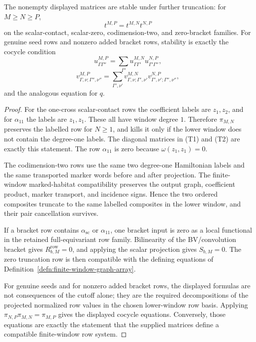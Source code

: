 \begin{prop}
  The nonempty displayed matrices are stable under further truncation:
  for \(M\geq N\geq P\),
  \[
    t^{M,P}=t^{M,N}t^{N,P}
  \]
  on the scalar-contact, scalar-zero, codimension-two, and zero-bracket
  families.  For genuine seed rows and nonzero added bracket rows, stability
  is exactly the cocycle condition
  \[
    u^{M,P}_{\Gamma\Gamma''}
      =
    \sum_{\Gamma'}u^{M,N}_{\Gamma\Gamma'}u^{N,P}_{\Gamma'\Gamma''},
  \]
  \[
    v^{M,P}_{\Gamma,\nu;\Gamma'',\nu''}
      =
    \sum_{\Gamma',\nu'}
      v^{M,N}_{\Gamma,\nu;\Gamma',\nu'}
      v^{N,P}_{\Gamma',\nu';\Gamma'',\nu''},
  \]
  and the analogous equation for \(q\).
\end{prop}

\begin{proof}
  For the one-cross scalar-contact rows the coefficient labels are
  \(z_1,z_2\), and for \(\alpha_{11}\) the labels are \(z_1,z_1\).  These
  all have window degree \(1\).  Therefore \(\pi_{M,N}\) preserves the
  labelled row for \(N\geq1\), and kills it only if the lower window does
  not contain the degree-one labels.  The diagonal matrices in (T1) and
  (T2) are exactly this statement.  The row \(\alpha_{11}\) is zero because
  \(\omega(z_1,z_1)=0\).

  The codimension-two rows use the same two degree-one Hamiltonian labels
  and the same transported marker words before and after projection.  The
  finite-window marked-habitat compatibility preserves the output graph,
  coefficient product, marker transport, and incidence signs.  Hence the two
  ordered composites truncate to the same labelled composites in the lower
  window, and their pair cancellation survives.

  If a bracket row contains \(\alpha_{\mathrm{sc}}\) or \(\alpha_{11}\), one
  bracket input is zero as a local functional in the retained
  full-equivariant row family.  Bilinearity of the BV/convolution bracket
  gives \(R^{\mathrm{row}}_{b,M}=0\), and applying the scalar projection
  gives \(S_{b,M}=0\).  The zero truncation row is then compatible with the
  defining equations of
  Definition~\ref{defn:finite-window-graph-array}.

  For genuine seeds and for nonzero added bracket rows, the displayed
  formulas are not consequences of the cutoff alone; they are the required
  decompositions of the projected normalized row values in the chosen
  lower-window row basis.  Applying
  \(\pi_{N,P}\pi_{M,N}=\pi_{M,P}\) gives the displayed cocycle equations.
  Conversely, those equations are exactly the statement that the supplied
  matrices define a compatible finite-window row system.
\end{proof}

